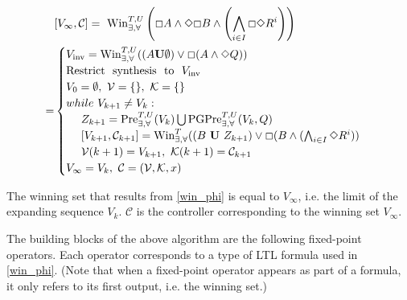 \begin{align}
& [V_{\infty},\mathcal{C}] =\  \text{Win}_{\exists, \forall}^{T,U}\left(\Square A \wedge \Diamond \Square B \wedge \left( \bigwedge_{i\in I} \Square \Diamond R^i\right)\right)\\
=&\begin{cases}V_{\text{inv}} = \text{\text{Win}}^{T,U}_{\exists, \forall} ((A\mathbf{U}\emptyset)\vee \Square (A\wedge \Diamond Q))\\
\text{Restrict~ synthesis~ to~ }V_{\text{inv}}\\
V_0 = \emptyset,\ \mathcal{V}=\{\},\ \mathcal{K} = \{\}\\
while\ V_{k+1} \not= V_k:\\
\ \ \ \ Z_{k+1} = \text{Pre}_{\exists,\forall}^{T,U} (V_k) \bigcup \text{PGPre}_{\exists,\forall}^{T,U} (V_k, Q)\\
\ \ \ \ [V_{k+1}, \mathcal{C}_{k+1}]=\text{Win}_{\exists,\forall}^{T} ((B \mathbf{\ U\ }Z_{k+1}) \vee \Square (B\wedge ( \bigwedge_{i\in I}\Diamond R^i))\\
\ \ \ \ \mathcal{V}(k+1)=V_{k+1},\ \mathcal{K}(k+1) = \mathcal{C}_{k+1}\\
V_{\infty} = V_k,\ \mathcal{C}=(\mathcal{V},\mathcal{K},x)
\end{cases}\label{win_phi}
\end{align}

The winning set {\color{purple} that results from} \eqref{win_phi} is {\color{purple} equal to} $ V_{\infty} $, i.e. {\color{purple} the limit of the expanding sequence $V_k$}. $ \mathcal{C} $ is the controller corresponding to the winning set $ V_{\infty} $. 

The building blocks of the above algorithm are the following fixed-point operators. Each operator corresponds to a type of LTL formula used in \eqref{win_phi}. (Note that when a fixed-point operator appears as part of a formula, it only refers to its first output, i.e. the winning set.)

